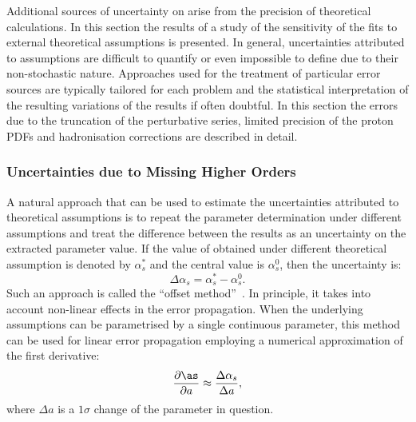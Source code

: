 Additional sources of uncertainty on \as arise from the precision of theoretical calculations. In this section the results of a study of the sensitivity of the \asz fits to external theoretical assumptions is presented. In general, uncertainties attributed to assumptions are difficult to quantify or even impossible to define due to their non-stochastic nature. Approaches used for the treatment of particular error sources are typically tailored for each problem and the statistical interpretation of the resulting variations of the results if often doubtful. In this section the errors due to the truncation of the perturbative series, limited precision of the proton PDFs and hadronisation corrections are described in detail.

\subsubsection{Uncertainties due to Missing Higher Orders}
\label{subsec:asscalevar}
A natural approach that can be used to estimate the uncertainties attributed to theoretical assumptions is to repeat the parameter determination under different assumptions and treat the difference between the results as an uncertainty on the extracted parameter value. If the value of \asz obtained under different theoretical assumption is denoted by $\alpha_s^{\ast}$ and the central value is $\alpha_s^0$, then the uncertainty is:
\begin{equation}
 \Delta\alpha_s = \alpha_s^{\ast} - \alpha_s^0.
\end{equation}
Such an approach is called the ``offset method''~\cite{Cooper:2010}. In principle, it takes into account non-linear effects in the error propagation. When the underlying assumptions can be parametrised by a single continuous parameter, this method can be used for linear error propagation employing a numerical approximation of the first derivative:
\begin{equation}
 \frac{\partial \as}{ \partial a} \approx \frac{\Delta\alpha_s}{\Delta a},
\end{equation}
where $\Delta a$ is a $1\sigma$ change of the parameter in question.

